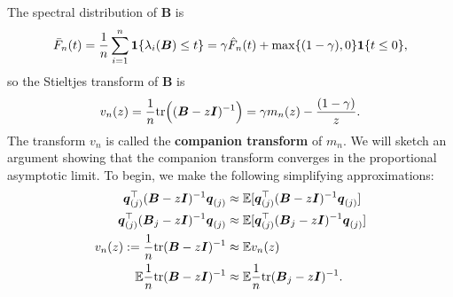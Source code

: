 \documentclass{article}
\newcommand{\bq}{\boldsymbol{q}}
\newcommand{\bB}{\boldsymbol{B}}
\newcommand{\bI}{\boldsymbol{I}}
\begin{document}
The spectral distribution of $\bB$ is 
$$
\bar{F}_n(t) = \frac{1}{n}\sum_{i = 1}^{n} \1\{\lambda_i(\bB) \leq t\} = \gamma \hat{F}_n(t) + \max\{(1 - \gamma),0\} \1\{t \leq 0\},
$$
so the Stieltjes transform of $\bB$ is 
$$
v_n(z) = \frac{1}{n} \tr\Big((\bB - z\bI)^{-1}\Big) = \gamma m_n(z) - \frac{(1 - \gamma)}{z}.
$$
The transform $v_n$ is called the {\bf companion transform} of $m_n$. We will sketch an argument showing that the companion transform converges in the proportional asymptotic limit. To begin, we make the following simplifying approximations:
\begin{align*}
	\bq_{(j)}^{\top} (\bB - z\bI)^{-1} \bq_{(j)} & \approx \mathbb{E}[\bq_{(j)}^{\top} (\bB - z\bI)^{-1} \bq_{(j)}] \\
	\bq_{(j)}^{\top} (\bB_j - z\bI)^{-1} \bq_{(j)} & \approx \mathbb{E}[\bq_{(j)}^{\top} (\bB_j - z\bI)^{-1} \bq_{(j)}] \\
	v_n(z) := \frac{1}{n}\tr(\bB - z \bI)^{-1} & \approx \mathbb{E} v_n(z) \\
	\mathbb{E}{\frac{1}{n}\tr(\bB - z \bI)^{-1}} & \approx \mathbb{E}{\frac{1}{n}\tr(\bB_j - z \bI)^{-1}}.
\end{align*}
\end{document}
